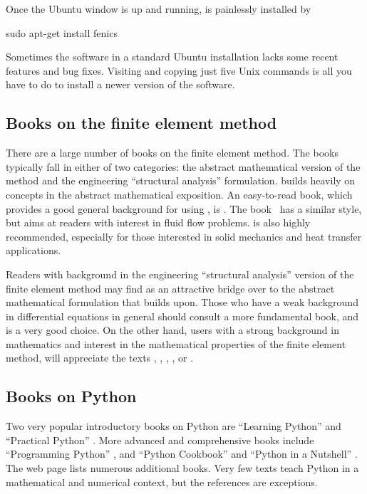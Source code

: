 Once the Ubuntu window is up and running, \fenics{} is painlessly
installed by
\vspace{4pt}
\begin{bash}
sudo apt-get install fenics
\end{bash}
Sometimes the \fenics{} software in a standard Ubuntu installation lacks
some recent features and bug fixes. Visiting 
and copying just five Unix commands is all you have to do to install a
newer version of the software.

\subsection{Books on the finite element method}
\label{langtangen:appendix:books}

There are a large number of books on the finite element method.  The books
typically fall in either of two categories: the abstract mathematical
version of the method and the engineering ``structural analysis''
formulation. \fenics{} builds heavily on concepts in the abstract
mathematical exposition.  An easy-to-read book, which provides a good
general background for using \fenics, is \citet{Gockenbach2006}. The
book~\citet{DoneaHuerta2003} has a similar style, but aims at readers
with interest in fluid flow problems. \citet{Hughes1987} is also highly
recommended, especially for those interested in solid mechanics and heat
transfer applications.

Readers with background in the engineering ``structural analysis''
version of the finite element method may find \citet{Bickford1994}
as an attractive bridge over to the abstract mathematical formulation
that \fenics{} builds upon.  Those who have a weak background in
differential equations in general should consult a more fundamental
book, and \citet{ErikssonEstepHansboEtAl1996} is a very good
choice. On the other hand, \fenics{} users with a strong background in
mathematics and interest in the mathematical properties of the finite
element method, will appreciate the texts \citet{BrennerScott2008},
\citet{Braess2007}, \citet{ErnGuermond2004}, \citet{QuarteroniValli2008},
or \citet{Ciarlet2002}.

\subsection{Books on Python}
\label{langtangen:appendix:pybooks}

Two very popular introductory books on Python are ``Learning Python''
\citep{Lutz2007} and ``Practical Python'' \citep{Hetland2002}.
More advanced and comprehensive books include ``Programming Python''
\citep{Lutz2006}, and ``Python Cookbook'' \citep{MartelliAscher2005}
and ``Python in a Nutshell'' \citep{Martelli2006}.  The web
page  lists
numerous additional books.  Very few texts teach Python in
a mathematical and numerical context, but the references
\citet{Langtangen2008,Langtangen20011,Kiusalaas2010} are exceptions.

